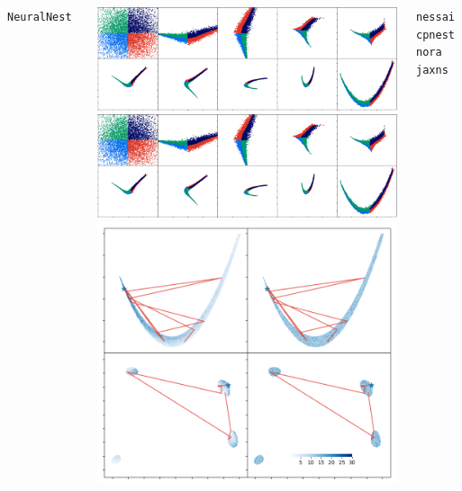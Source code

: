 \documentclass[aspectratio=169]{beamer}
\begin{document}
\begin{frame}
\begin{columns}[t]
        \vfill
        \texttt{NeuralNest}~
        \begin{columns}
            \includegraphics[width=\textwidth]{figures/rosenbrock_flow.png}
            \includegraphics[width=\textwidth]{figures/himmelblau_flow.png}
            \includegraphics[width=\textwidth]{figures/chains.png}
        \end{columns}
        \texttt{nessai}~ \texttt{cpnest} \texttt{nora}~ \texttt{jaxns}~

\end{columns}
\end{frame}
\end{document}
